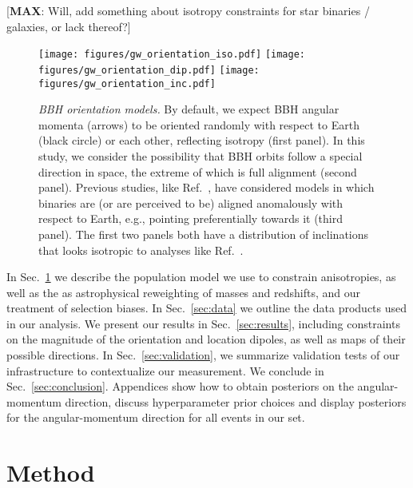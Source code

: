 \documentclass[aps,prd,twocolumn,superscriptaddress,preprintnumbers,floatfix,nofootinbib]{revtex4-2}
\newcommand*{\mi}[1]{{\color{magenta} [{\bf MAX}: #1]}}
\begin{document}
\mi{Will, add something about isotropy constraints for star binaries / galaxies, or lack thereof?}


\begin{figure*}
\texttt{[image: figures/gw\_orientation\_iso.pdf]}
\texttt{[image: figures/gw\_orientation\_dip.pdf]}
\texttt{[image: figures/gw\_orientation\_inc.pdf]}
\caption{\emph{\ac{BBH} orientation models.} By default, we expect \ac{BBH} angular momenta (arrows) to be oriented randomly with respect to Earth (black circle) or each other, reflecting isotropy (first panel).
In this study, we consider the possibility that \ac{BBH} orbits follow a special direction in space, the extreme of which is full alignment (second panel).
Previous studies, like Ref.~\cite{Vitale:2022pmu}, have considered models in which binaries are (or are perceived to be) aligned anomalously with respect to Earth, e.g., pointing preferentially towards it (third panel).
The first two panels both have a distribution of inclinations that looks isotropic to analyses like Ref.~\cite{Vitale:2022pmu}.
}
\label{fig:vectors}
\end{figure*}

In Sec.~\ref{sec:method} we describe the population model we use to constrain anisotropies, as well as the as astrophysical reweighting of masses and redshifts, and our treatment of selection biases.
In Sec.~\ref{sec:data} we outline the data products used in our analysis.
We present our results in Sec.~\ref{sec:results}, including constraints on the magnitude of the orientation and location dipoles, as well as maps of their possible directions.
In Sec.~\ref{sec:validation}, we summarize validation tests of our infrastructure to contextualize our measurement.
We conclude in Sec.~\ref{sec:conclusion}.
Appendices show how to obtain posteriors on the angular-momentum direction, discuss hyperparameter prior choices and display posteriors for the angular-momentum direction for all events in our set.

\section{Method}
\label{sec:method}
\end{document}
